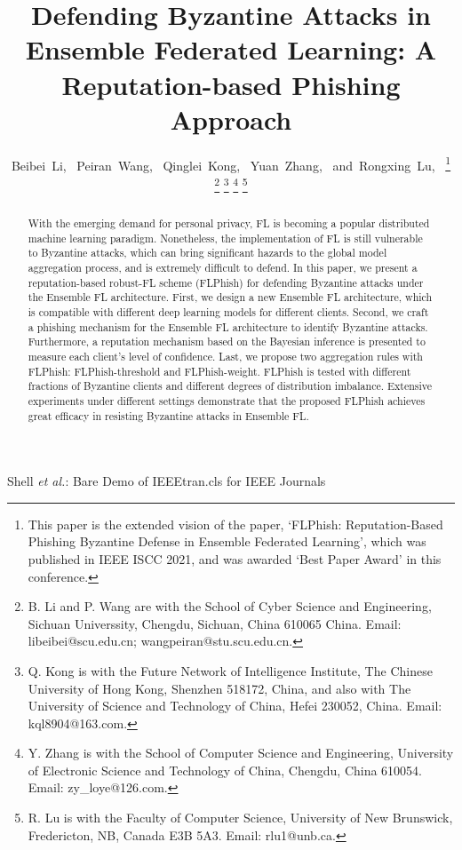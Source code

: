 \documentclass[journal]{IEEEtran}
\begin{document}
\title{Defending Byzantine Attacks in Ensemble Federated Learning: A Reputation-based Phishing Approach}


\author{Beibei~Li,~
        Peiran~Wang,~
        Qinglei~Kong,~
        Yuan~Zhang,~
        and~Rongxing~Lu,~
\thanks{This paper is the extended vision of the paper, `FLPhish: Reputation-Based Phishing Byzantine Defense in Ensemble Federated Learning', which was published in IEEE ISCC 2021, and was awarded `Best Paper Award' in this conference.}
\thanks{B. Li and P. Wang are with the School of Cyber Science and Engineering, Sichuan Universsity, Chengdu, Sichuan, China 610065 China. Email: libeibei@scu.edu.cn; wangpeiran@stu.scu.edu.cn.}
\thanks{Q. Kong is with the Future Network of Intelligence Institute, The Chinese University of Hong Kong, Shenzhen 518172, China, and also with The University of Science and Technology of China, Hefei 230052, China. Email: kql8904@163.com.}
\thanks{Y. Zhang is with the School of Computer Science and Engineering, University of Electronic Science and Technology of China, Chengdu, China 610054. Email: zy\_loye@126.com.}
\thanks{R. Lu is with the Faculty of Computer Science, University of New Brunswick, Fredericton, NB, Canada E3B 5A3. Email: rlu1@unb.ca.}
}



%
{Shell \MakeLowercase{\textit{et al.}}: Bare Demo of IEEEtran.cls for IEEE Journals}

\maketitle
\begin{abstract}
  With the emerging demand for personal privacy, FL is becoming a popular distributed machine learning paradigm. Nonetheless, the implementation of FL is still vulnerable to Byzantine attacks, which can bring significant hazards to the global model aggregation process, and is extremely difficult to defend. In this paper, we present a reputation-based robust-FL scheme (FLPhish) for defending Byzantine attacks under the Ensemble FL architecture. First, we design a new Ensemble FL architecture, which is compatible with different deep learning models for different clients. Second, we craft a phishing mechanism for the Ensemble FL architecture to identify Byzantine attacks. Furthermore, a reputation mechanism based on the Bayesian inference is presented to measure each client's level of confidence. Last, we propose two aggregation rules with FLPhish: FLPhish-threshold and FLPhish-weight. FLPhish is tested with different fractions of Byzantine clients and different degrees of distribution imbalance. Extensive experiments under different settings demonstrate that the proposed FLPhish achieves great efficacy in resisting Byzantine attacks in Ensemble FL.
\end{abstract}
\end{document}
